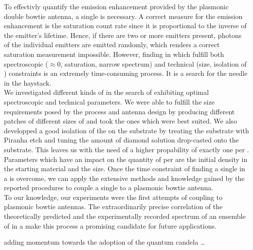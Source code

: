 
   To effectivly quantify the emission enhancement provided by the plasmonic double bowtie antenna, a single \siv is necessary.
   A correct measure for the emission enhancement is the saturation count rate since it is proportional to the inverse of the emitter's lifetime.
   Hence, if there are two or more emitters present, photons of the individual emitters are emitted randomly, which renders a correct saturation measurement impossible.
   However, finding \sivs in \nds which fulfill both spectroscopic (\gtz $\approx$0, saturation, narrow \ZPL spectrum) and technical (size, isolation of \nds) constraints is an extremely time-consuming process. It is a search for the needle in the haystack.
   \\
   We investigated different kinds of \nds in the search of \nds exhibiting optimal spectroscopic and technical parameters.
   We were able to fulfill the size requirements posed by the \pp process and antenna design by producing different patches of different sizes of \nds and took the ones which were best suited.
   We also developped a good isolation of the \nds on the substrate by treating the \ir substrate with Piranha etch and tuning the amount of diamond solution drop-casted onto the substrate.
   This leaves us with the need of a higher propability of exactly one \siv per \nd.
   Parameters which have an impact on the quantity of \sivs per \nd are the initial \siv density in the starting material and the \nd size.
   Once the time constraint of finding a single \siv in a \nd is overcome, we can apply the extensive methods and knowledge gained by the reported procedures to couple a single \siv to a plasmonic bowtie antenna.
   \\
   To our knowledge, our experiments were the first attempts of coupling \sivs to plasmonic bowtie antennas.
   The extraordinarily precise correlation of the theoretically predicted and the experimentally recorded spectrum of an ensemble of \sivs in a \nd make this process a promising candidate for future applications.



   adding momentum towards the adoption of the quantum candela \dots
